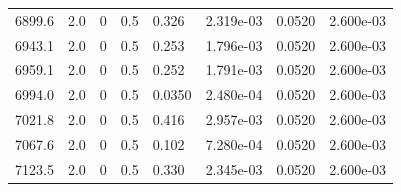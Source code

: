 \documentclass[preview]{standalone}
\begin{document}
{{{{{\begin{tabular}{L{1.2cm}C{1.2cm} C{0.3cm}C{0.5cm} C{1.4cm}C{1.4cm} C{1.4cm}C{1.4cm}}
  6899.6  &   2.0  & 0     & 0.5 &  0.326  & 2.319e-03  & 0.0520 &  2.600e-03   \\ 
  6943.1  &   2.0  & 0     & 0.5 &  0.253  & 1.796e-03  & 0.0520 &  2.600e-03   \\ 
  6959.1  &   2.0  & 0     & 0.5 &  0.252  & 1.791e-03  & 0.0520 &  2.600e-03   \\ 
  6994.0  &   2.0  & 0     & 0.5 &  0.0350  & 2.480e-04  & 0.0520 &  2.600e-03   \\ 
  7021.8  &   2.0  & 0     & 0.5 &  0.416  & 2.957e-03  & 0.0520 &  2.600e-03   \\ 
  7067.6  &   2.0  & 0     & 0.5 &  0.102  & 7.280e-04  & 0.0520 &  2.600e-03   \\ 
  7123.5  &   2.0  & 0     & 0.5 &  0.330  & 2.345e-03  & 0.0520 &  2.600e-03   \\ 
\hline 
\end{tabular} 

}}}}}
\end{document}
